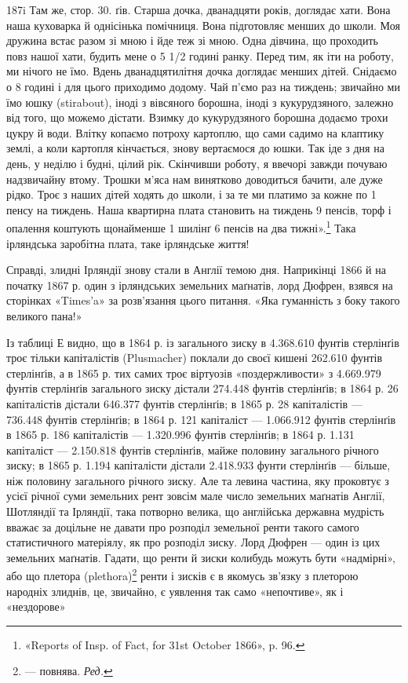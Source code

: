 187i Там же, стор. 30.
ґів. Старша дочка, дванадцяти років, доглядає хати. Вона наша
куховарка й однісінька помічниця. Вона підготовляє менших
до школи. Моя дружина встає разом зі мною і йде теж зі мною.
Одна дівчина, що проходить повз нашої хати, будить мене о 5 1/2
годині ранку. Перед тим, як іти на роботу, ми нічого не їмо.
Вдень дванадцятилітня дочка доглядає менших дітей. Снідаємо
о 8 годині і для цього приходимо додому. Чай п’ємо раз на тиждень;
звичайно ми їмо юшку (stirabout), іноді з вівсяного борошна,
іноді з кукурудзяного, залежно від того, що можемо дістати.
Взимку до кукурудзяного борошна додаємо трохи цукру й води.
Влітку копаємо потроху картоплю, що сами садимо на клаптику
землі, а коли картопля кінчається, знову вертаємося до юшки.
Так іде з дня на день, у неділю і будні, цілий рік. Скінчивши
роботу, я ввечорі завжди почуваю надзвичайну втому. Трошки
м’яса нам винятково доводиться бачити, але дуже рідко. Троє
з наших дітей ходять до школи, і за те ми платимо за кожне по
1 пенсу на тиждень. Наша квартирна плата становить на тиждень
9 пенсів, торф і опалення коштують щонайменше 1 шилінґ 6 пенсів
на два тижні».\footnote{
«Reports of Insp. of Fact, for 31st October 1866», p. 96.
} Така ірляндська заробітна плата, таке
ірляндське життя!

Справді, злидні Ірляндії знову стали в Англії темою дня.
Наприкінці 1866 й на початку 1867 р. один з ірляндських земельних
маґнатів, лорд Дюфрен, взявся на сторінках «Times’a» за
розв’язання цього питання. «Яка гуманність з боку такого великого
пана!»

Із таблиці Е видно, що в 1864 р. із загального зиску в 4.368.610
фунтів стерлінґів троє тільки капіталістів (Plusmacher) поклали до
своєї кишені 262.610 фунтів стерлінґів, а в 1865 р. тих самих троє
віртуозів «поздержливости» з 4.669.979 фунтів стерлінґів загального
зиску дістали 274.448 фунтів стерлінґів; в 1864 р. 26 капіталістів
дістали 646.377 фунтів стерлінґів; в 1865 р. 28 капіталістів —
736.448 фунтів стерлінґів; в 1864 р. 121 капіталіст — 1.066.912
фунтів стерлінґів в 1865 р. 186 капіталістів — 1.320.996 фунтів
стерлінґів; в 1864 р. 1.131 капіталіст — 2.150.818 фунтів стерлінґів,
майже половину загального річного зиску; в 1865 р.
1.194 капіталісти дістали 2.418.933 фунти стерлінґів — більше, ніж
половину загального річного зиску. Але та левина частина,
яку проковтує з усієї річної суми земельних рент зовсім мале
число земельних маґнатів Англії, Шотляндії та Ірляндії, така
потворно велика, що англійська державна мудрість вважає за
доцільне не давати про розподіл земельної ренти такого самого
статистичного матеріялу, як про розподіл зиску. Лорд Дюфрен
— один із цих земельних маґнатів. Гадати, що ренти й зиски
колибудь можуть бути «надмірні», або що плетора (plethora)\footnote*{
— повнява. \emph{Ред.}
}
ренти і зисків є в якомусь зв’язку з плеторою народніх злиднів,
це, звичайно, є уявлення так само «непочтиве», як і «нездорове»
\parbreak{}  %

